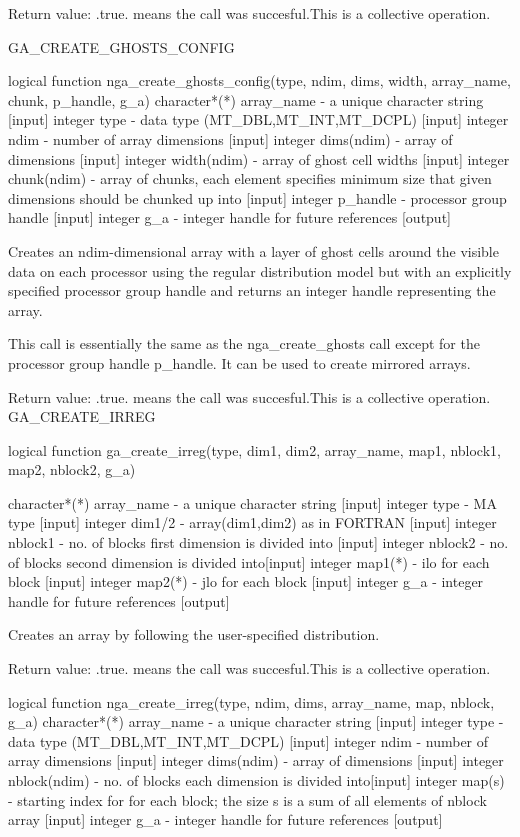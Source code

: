 Return value: .true. means the call was succesful.This is a collective
operation.

GA\_CREATE\_GHOSTS\_CONFIG

logical function nga\_create\_ghosts\_config(type, ndim, dims, width,
array\_name, chunk, p\_handle, g\_a) character{*}({*}) array\_name
- a unique character string {[}input{]} integer type - data type (MT\_DBL,MT\_INT,MT\_DCPL)
{[}input{]} integer ndim - number of array dimensions {[}input{]}
integer dims(ndim) - array of dimensions {[}input{]} integer width(ndim)
- array of ghost cell widths {[}input{]} integer chunk(ndim) - array
of chunks, each element specifies minimum size that given dimensions
should be chunked up into {[}input{]} integer p\_handle - processor
group handle {[}input{]} integer g\_a - integer handle for future
references {[}output{]}

Creates an ndim-dimensional array with a layer of ghost cells around
the visible data on each processor using the regular distribution
model but with an explicitly specified processor group handle and
returns an integer handle representing the array.

This call is essentially the same as the nga\_create\_ghosts call
except for the processor group handle p\_handle. It can be used to
create mirrored arrays.

Return value: .true. means the call was succesful.This is a collective
operation. GA\_CREATE\_IRREG

logical function ga\_create\_irreg(type, dim1, dim2, array\_name,
map1, nblock1, map2, nblock2, g\_a)

character{*}({*}) array\_name - a unique character string {[}input{]}
integer type - MA type {[}input{]} integer dim1/2 - array(dim1,dim2)
as in FORTRAN {[}input{]} integer nblock1 - no. of blocks first dimension
is divided into {[}input{]} integer nblock2 - no. of blocks second
dimension is divided into{[}input{]} integer map1({*}) - ilo for each
block {[}input{]} integer map2({*}) - jlo for each block {[}input{]}
integer g\_a - integer handle for future references {[}output{]}

Creates an array by following the user-specified distribution.

Return value: .true. means the call was succesful.This is a collective
operation.

logical function nga\_create\_irreg(type, ndim, dims, array\_name,
map, nblock, g\_a) character{*}({*}) array\_name - a unique character
string {[}input{]} integer type - data type (MT\_DBL,MT\_INT,MT\_DCPL)
{[}input{]} integer ndim - number of array dimensions {[}input{]}
integer dims(ndim) - array of dimensions {[}input{]} integer nblock(ndim)
- no. of blocks each dimension is divided into{[}input{]} integer
map(s) - starting index for for each block; the size s is a sum of
all elements of nblock array {[}input{]} integer g\_a - integer handle
for future references {[}output{]}

